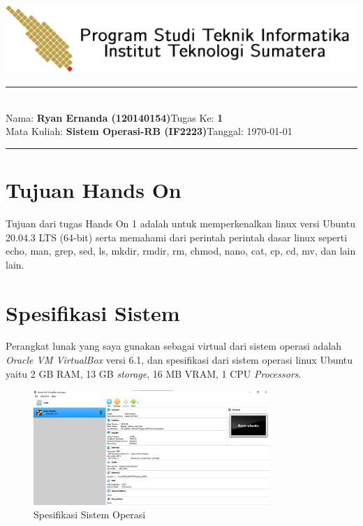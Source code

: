 \documentclass[11pt,a4paper]{article}
\newcommand{\stuid}{120140154}
\newcommand{\student}{\textbf{Ryan Ernanda (\stuid{})}}
\newcommand{\course}{\textbf{Sistem Operasi-RB (IF2223)}}
\newcommand{\assignment}{\textbf{1}} %
\begin{document}
\thispagestyle{empty}
\begin{center}
	\includegraphics[scale = 0.15]{Gambar/ifitera-header.png}
	\vspace{0.1cm}
\end{center}
\noindent
{\large
\rule{17cm}{0.2cm}\\[0.3cm]
Nama: \student \hfill Tugas Ke: \assignment\\[0.1cm]
Mata Kuliah: \course \hfill Tanggal: \today\\
\rule{17cm}{0.05cm}
\vspace{0.1cm}
}


\section{Tujuan Hands On}
    Tujuan dari tugas Hands On 1 adalah untuk memperkenalkan linux versi Ubuntu 20.04.3 LTS (64-bit) serta memahami dari perintah perintah dasar linux seperti echo, man, grep, sed, ls, mkdir, rmdir, rm, chmod, nano, cat, cp, cd, mv, dan lain lain.

\section{Spesifikasi Sistem}
    Perangkat lunak yang saya gunakan sebagai virtual dari sistem operasi adalah \textit{Oracle VM VirtualBox} versi 6.1, dan spesifikasi dari sistem operasi linux Ubuntu yaitu 2 GB RAM, 13 GB \textit{storage}, 16 MB VRAM, 1 CPU \textit{Processors}. 
    \begin{figure}[h]
    \centering
    \includegraphics[width=0.8\textwidth]{Gambar/Spek.png}
    \caption{Spesifikasi Sistem Operasi}
    \label{fig:my_label}
    \end{figure}
\end{document}
